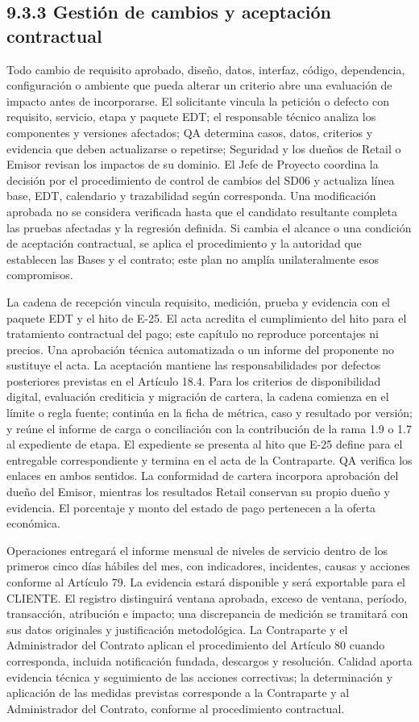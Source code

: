 \documentclass[11pt]{article}
\begin{document}
\subsection{9.3.3 Gestión de cambios y aceptación contractual}

Todo cambio de requisito aprobado, diseño, datos, interfaz, código, dependencia, configuración o ambiente que pueda alterar un criterio abre una evaluación de impacto antes de incorporarse. El solicitante vincula la petición o defecto con requisito, servicio, etapa y paquete EDT; el responsable técnico analiza los componentes y versiones afectados; QA determina casos, datos, criterios y evidencia que deben actualizarse o repetirse; Seguridad y los dueños de Retail o Emisor revisan los impactos de su dominio. El Jefe de Proyecto coordina la decisión por el procedimiento de control de cambios del SD06 y actualiza línea base, EDT, calendario y trazabilidad según corresponda. Una modificación aprobada no se considera verificada hasta que el candidato resultante completa las pruebas afectadas y la regresión definida. Si cambia el alcance o una condición de aceptación contractual, se aplica el procedimiento y la autoridad que establecen las Bases y el contrato; este plan no amplía unilateralmente esos compromisos.

La cadena de recepción vincula requisito, medición, prueba y evidencia con el paquete EDT y el hito de E-25. El acta acredita el cumplimiento del hito para el tratamiento contractual del pago; este capítulo no reproduce porcentajes ni precios. Una aprobación técnica automatizada o un informe del proponente no sustituye el acta. La aceptación mantiene las responsabilidades por defectos posteriores previstas en el Artículo 18.4.
Para los criterios de disponibilidad digital, evaluación crediticia y migración de cartera, la cadena comienza en el límite o regla fuente; continúa en la ficha de métrica, caso y resultado por versión; y reúne el informe de carga o conciliación con la contribución de la rama 1.9 o 1.7 al expediente de etapa. El expediente se presenta al hito que E-25 define para el entregable correspondiente y termina en el acta de la Contraparte. QA verifica los enlaces en ambos sentidos. La conformidad de cartera incorpora aprobación del dueño del Emisor, mientras los resultados Retail conservan su propio dueño y evidencia. El porcentaje y monto del estado de pago pertenecen a la oferta económica.

Operaciones entregará el informe mensual de niveles de servicio dentro de los primeros cinco días hábiles del mes, con indicadores, incidentes, causas y acciones conforme al Artículo 79. La evidencia estará disponible y será exportable para el CLIENTE. El registro distinguirá ventana aprobada, exceso de ventana, período, transacción, atribución e impacto; una discrepancia de medición se tramitará con sus datos originales y justificación metodológica. La Contraparte y el Administrador del Contrato aplican el procedimiento del Artículo 80 cuando corresponda, incluida notificación fundada, descargos y resolución. Calidad aporta evidencia técnica y seguimiento de las acciones correctivas; la determinación y aplicación de las medidas previstas corresponde a la Contraparte y al Administrador del Contrato, conforme al procedimiento contractual.
\end{document}
